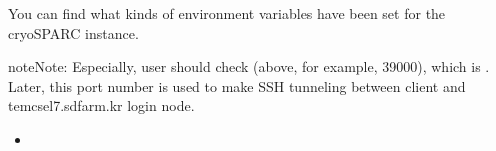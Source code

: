 \documentclass[a4paper,11pt,english]{sphinxmanual}
\begin{document}
\sphinxAtStartPar
You can find what kinds of environment variables have been set for the cryoSPARC instance.

\begin{sphinxadmonition}{note}{Note:}
\sphinxAtStartPar
Especially, user should check  (above, for example, 39000), which is .
Later, this port number is used to make SSH tunneling between client and tem\sphinxhyphen{}cs\sphinxhyphen{}el7.sdfarm.kr login node.
\end{sphinxadmonition}
\begin{itemize}
\item {} 
\sphinxAtStartPar
{}

\end{itemize}
\end{document}
